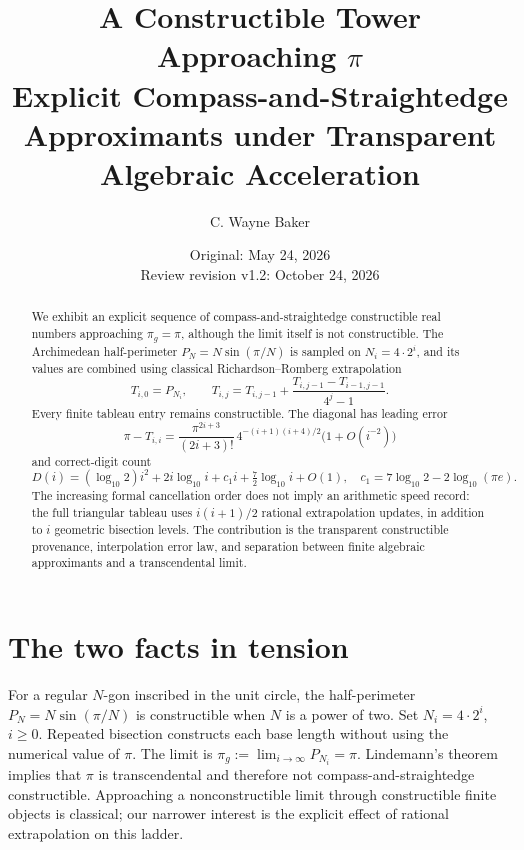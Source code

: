 \documentclass[11pt]{article}
\title{\textbf{A Constructible Tower Approaching $\pi$}\\\large Explicit Compass-and-Straightedge Approximants under Transparent Algebraic Acceleration}
\author{C. Wayne Baker}
\date{Original: May 24, 2026\\Review revision v1.2: October 24, 2026}
\begin{document}
\maketitle
\begin{abstract}
We exhibit an explicit sequence of compass-and-straightedge constructible real numbers approaching $\pi_g=\pi$, although the limit itself is not constructible. The Archimedean half-perimeter $P_N=N\sin(\pi/N)$ is sampled on $N_i=4\cdot2^i$, and its values are combined using classical Richardson--Romberg extrapolation
\[
T_{i,0}=P_{N_i},\qquad T_{i,j}=T_{i,j-1}+\frac{T_{i,j-1}-T_{i-1,j-1}}{4^j-1}.
\]
Every finite tableau entry remains constructible. The diagonal has leading error
\[
\pi-T_{i,i}=\frac{\pi^{2i+3}}{(2i+3)!}\,4^{-(i+1)(i+4)/2}\bigl(1+O(i^{-2})\bigr)
\]
and correct-digit count
\[
D(i)=(\log_{10}2)i^2+2i\log_{10}i+c_1i+\tfrac72\log_{10}i+O(1),\quad
c_1=7\log_{10}2-2\log_{10}(\pi e).
\]
The increasing formal cancellation order does not imply an arithmetic speed record: the full triangular tableau uses $i(i+1)/2$ rational extrapolation updates, in addition to $i$ geometric bisection levels. The contribution is the transparent constructible provenance, interpolation error law, and separation between finite algebraic approximants and a transcendental limit.
\end{abstract}
\section{The two facts in tension}
For a regular $N$-gon inscribed in the unit circle, the half-perimeter $P_N=N\sin(\pi/N)$ is constructible when $N$ is a power of two. Set $N_i=4\cdot2^i$, $i\ge0$. Repeated bisection constructs each base length without using the numerical value of $\pi$. The limit is $\pi_g:=\lim_{i\to\infty}P_{N_i}=\pi$. Lindemann's theorem implies that $\pi$ is transcendental and therefore not compass-and-straightedge constructible. Approaching a nonconstructible limit through constructible finite objects is classical; our narrower interest is the explicit effect of rational extrapolation on this ladder.
\end{document}
